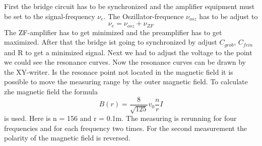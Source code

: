 First the bridge circuit has to be synchronized and the amplifier equipment must be set to the signal-frequency $\nu_e$.
The Oszillator-frequence $\nu_{osz}$ has to be adjust to
\begin{equation}
  \nu_e = \nu_{osz} +\nu_{ZF}
\end{equation}
The ZF-amplifier has to get minimized and the preamplifier has to get maximized.
After that the bridge ist going to synchronized by adjust $C_{grob}$, $C_{fein}$ and R to get a minimized signal.
Next we had to adjust the voltage to the point we could see the resonance curves.
Now the resonance curves can be drawn by the XY-writer.
Is the resonace point not located in the magnetic field it is possible to move the measuring range by the outer magnetic field.
To calculate zhe magnetic field the formula
\begin{equation}
  B(r) =\frac{8}{\sqrt{125}}v_0\frac{n}{r}I
\end{equation}
is used.
Here is n = 156 and r = 0.1m.
The measuring is rerunning for four frequencies and for each frequency two times.
For the second measurement the polarity of the magnetic field is reversed.


